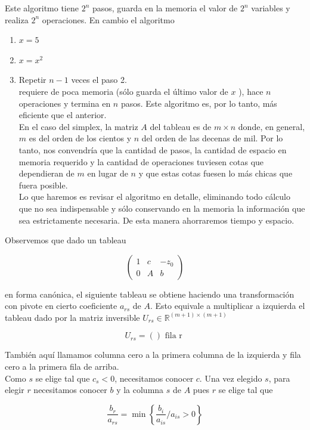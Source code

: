 \documentclass[10pt]{article}
\begin{document}
Este algoritmo tiene $2^{n}$ pasos, guarda en la memoria el valor de $2^{n}$ variables y realiza $2^{n}$ operaciones. En cambio el algoritmo

\begin{enumerate}
  \item $x=5$
  \item $x=x^{2}$
  \item Repetir $n-1$ veces el paso 2.\\
requiere de poca memoria (sólo guarda el último valor de $x$ ), hace $n$ operaciones y termina en $n$ pasos. Este algoritmo es, por lo tanto, más eficiente que el anterior.\\
En el caso del simplex, la matriz $A$ del tableau es de $m \times n$ donde, en general, $m$ es del orden de los cientos y $n$ del orden de las decenas de mil. Por lo tanto, nos convendría que la cantidad de pasos, la cantidad de espacio en memoria requerido y la cantidad de operaciones tuviesen cotas que dependieran de $m$ en lugar de $n$ y que estas cotas fuesen lo más chicas que fuera posible.\\
Lo que haremos es revisar el algoritmo en detalle, eliminando todo cálculo que no sea indispensable y sólo conservando en la memoria la información que sea estrictamente necesaria. De esta manera ahorraremos tiempo y espacio.
\end{enumerate}

Observemos que dado un tableau

$$
\left(\begin{array}{cc|c}
1 & c & -z_{0} \\
0 & A & b
\end{array}\right)
$$

en forma canónica, el siguiente tableau se obtiene haciendo una transformación con pivote en cierto coeficiente $a_{r s}$ de $A$. Esto equivale a multiplicar a izquierda el tableau dado por la matriz inversible $U_{r s} \in \mathbb{R}^{(m+1) \times(m+1)}$

$$
U_{r s}=\left(\right) \text { fila r }
$$

También aquí llamamos columna cero a la primera columna de la izquierda y fila cero a la primera fila de arriba.\\
Como $s$ se elige tal que $c_{s}<0$, necesitamos conocer $c$. Una vez elegido $s$, para elegir $r$ necesitamos conocer $b$ y la columna $s$ de $A$ pues $r$ se elige tal que

$$
\frac{b_{r}}{a_{r s}}=\min \left\{\frac{b_{i}}{a_{i s}} / a_{i s}>0\right\}
$$
\end{document}
